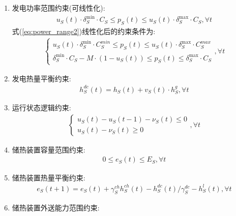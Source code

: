 \documentclass{article}
\begin{document}
\begin{enumerate}
{\begin{enumerate}
{\begin{align}
                \end{align}
            }
            \item {发电功率范围约束({\color{red}可线性化}):
                \begin{align}
                    u_{S}(t)\cdot\delta_{S}^{\min}\cdot C_{S}\leq p_{S}(t)\leq u_{S}(t)\cdot\delta_{S}^{\max}\cdot C_{S},\forall t \label{eq:power_range2}
                \end{align}
                式(\ref{eq:power_range2})线性化后的约束条件为:
                \begin{align}
                    \begin{cases}
                        u_{S}(t)\cdot\delta_{S}^{\min}\cdot C_{S}^{min}\leq p_{S}(t)\leq u_{S}(t)\cdot\delta_{S}^{\max}\cdot C_{S}^{max}\\
                        \delta_{S}^{\min}\cdot C_{S} - M \cdot (1-u_{S}(t)) \leq p_{S}(t)\leq \delta_{S}^{\max}\cdot C_{S}
                    \end{cases},\forall t
                \end{align}
            }
            \item {发电热量平衡约束:
                \begin{align}
                    h_S^{dc}(t)=h_S(t)+v_S(t)\cdot h_S^g,\forall t
                \end{align}
            }
            \item {运行状态逻辑约束:
                \begin{align}
                    \begin{cases}u_S(t)-u_S(t-1)-\nu_S(t)\leq0\\u_S(t)-\nu_S(t)\geq0\end{cases},\forall t
                \end{align}
            }
            \item {储热装置容量范围约束:
                \begin{align}
                    0\leq e_S(t)\leq E_S,\forall t
                \end{align}
            }
            \item {储热装置热量平衡约束:
                \begin{align}
                    e_S(t+1)=e_S(t)+\gamma_S^{ch}h_S^{ch}(t)-h_S^{dc}(t)/\gamma_S^{dc}-h_S^{l}(t),\forall t
                \end{align}
            }
            \item {储热装置外送能力范围约束:
}
\end{enumerate}}
\end{enumerate}
\end{document}
